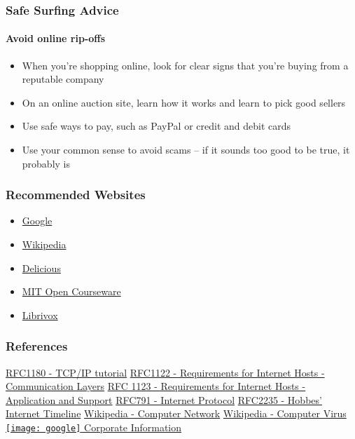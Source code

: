 \documentclass[hyperref={xetex,colorlinks,linkcolor=blue},green,compress]{beamer}
\newcommand\googlelogo{\texttt{[image: google]}}
\begin{document}
\begin{frame}\frametitle{Safe Surfing Advice}\framesubtitle{Avoid online rip-offs}

\begin{itemize}
\item When you’re shopping online, look for clear signs that you’re buying from a reputable company
\item On an online auction site, learn how it works and learn to pick good sellers
\item Use safe ways to pay, such as PayPal or credit and debit cards
\item Use your common sense to avoid scams – if it sounds too good to be true, it probably is
\end{itemize}

\end{frame}

\begin{frame}\frametitle{Recommended Websites}

\begin{itemize}
\item \href{http://google.com}{Google}
\item \href{http://en.wikipedia.org}{Wikipedia}
\item \href{http://del.icio.us}{Delicious}
\item \href{http://ocw.mit.edu/OcwWeb/web/home/home/index.htm}{MIT Open Courseware}      
\item \href{http://www.librivox.org}{Librivox}      
\end{itemize}

\end{frame}

\begin{frame}\frametitle{References}

\begin{thebibliography}{}
\bibitem[RFC1180]{}\href{http://www.rfc-editor.org/rfc/rfc1180.txt}{RFC1180 - TCP/IP tutorial}
\bibitem[RFC1122]{}\href{http://www.faqs.org/rfcs/rfc1122.html}{RFC1122 - Requirements for Internet Hosts - Communication Layers}
\bibitem[RFC1123]{}\href{http://www.faqs.org/rfcs/rfc1123.html}{RFC 1123 - Requirements for Internet Hosts - Application and Support}                   
\bibitem[RFC791]{}\href{http://www.ietf.org/rfc/rfc791.txt}{RFC791 - Internet Protocol}
\bibitem[RFC2235]{}\href{http://www.faqs.org/rfcs/rfc2235.html}{RFC2235 - Hobbes' Internet Timeline}
\bibitem[]{}\href{http://en.wikipedia.org/wiki/Computer_network}{Wikipedia - Computer Network}
\bibitem[]{}\href{http://en.wikipedia.org/wiki/Computer_virus}{Wikipedia - Computer Virus}
\bibitem[]{}\href{http://www.google.com/intl/en/corporate/}{\googlelogo{} Corporate Information}
\end{thebibliography}

\end{frame}
\end{document}
